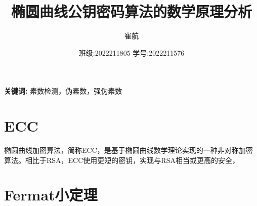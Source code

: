 \documentclass[a4paper]{article}
\title{\heiti\zihao{3} 椭圆曲线公钥密码算法的数学原理分析}
\date{班级:2022211805 学号:2022211576}
\author{\songti 崔航}
\providecommand{\keywords}[1]
{
    \small	
    \textbf{关键词:} #1
}
\providecommand{\keywords}[1]
{
  \small	
  \textbf{关键词:} #1
}
\begin{document}
    \maketitle
\begin{abstract}

\end{abstract}
\keywords{素数检测，伪素数，强伪素数}
\tableofcontents
\section{ECC}
椭圆曲线加密算法，简称ECC，是基于椭圆曲线数学理论实现的一种非对称加密算法。相比于RSA，ECC使用更短的密钥，实现与RSA相当或更高的安全，
\section{Fermat小定理}

\begin{thebibliography}{1000}  
    
\end{thebibliography}
\end{document}
